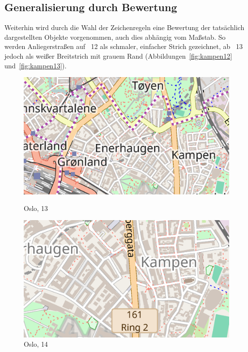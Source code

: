 \documentclass[../main/thesis.tex]{subfiles}
\begin{document}
\subsection{Generalisierung durch Bewertung}

Weiterhin wird durch die Wahl der Zeichenregeln eine Bewertung der tatsächlich dargestellten Objekte vorgenommen, auch dies abhängig vom Maßstab. So werden Anliegerstraßen auf ~12 als schmaler, einfacher Strich gezeichnet, ab ~13 jedoch als weißer Breitstrich mit grauem Rand (Abbildungen~\ref{fig:kampen12} und~\ref{fig:kampen13}).




\begin{figure}[ht]
  \begin{minipage}{.5\linewidth}
    \centering
    \includegraphics[width=\ScaleIfNeeded]{../chapter2/kampen-z13}
    \caption{Oslo,  13}\label{fig:kampen13}
  \end{minipage}%
  \begin{minipage}{.5\linewidth}
    \centering
    \includegraphics[width=\ScaleIfNeeded]{../chapter2/kampen-z14}
    \caption{Oslo,  14}\label{fig:kampen14}
  \end{minipage}
\end{figure}
\end{document}

